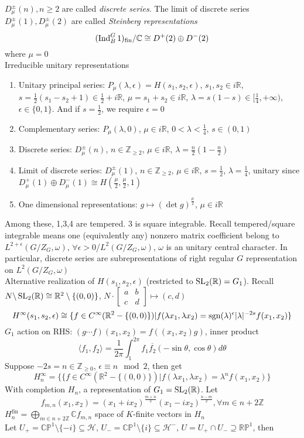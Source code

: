 \documentclass[main]{subfiles}
\begin{document}
$D^\pm_\mu(n),n\geq2$ are called \textit{discrete series}. The limit of discrete series $D^\pm_\mu(1),D^\pm_\mu(2)$ are called \textit{Steinberg representations}
\[(\operatorname{Ind}^G_B1)_{\mathrm{fin}}/\mathbb C\cong D^+(2)\oplus D^-(2)\]
where $\mu=0$ \\
Irreducible unitary representations
\begin{enumerate}
\item Unitary principal series: $P_\mu(\lambda,\epsilon)=H(s_1,s_2,\epsilon)$, $s_1,s_2\in i\mathbb R$, $s=\frac{1}{2}(s_1-s_2+1)\in\frac{1}{2}+i\mathbb R$, $\mu=s_1+s_2\in i\mathbb R$, $\lambda=s(1-s)\in[\frac{1}{4},+\infty)$, $\epsilon\in\{0,1\}$. And if $s=\frac{1}{2}$, we require $\epsilon=0$
\item Complementary series: $P_\mu(\lambda,0)$, $\mu\in i\mathbb R$, $0<\lambda<\frac{1}{4}$, $s\in(0,1)$
\item Discrete series: $D^\pm_\mu(n)$, $n\in\mathbb Z_{\geq2}$, $\mu\in i\mathbb R$, $\lambda=\frac{n}{2}(1-\frac{n}{2})$
\item Limit of discrete series: $D^\pm_\mu(1)$, $n\in\mathbb Z_{\geq2}$, $\mu\in i\mathbb R$, $s=\frac{1}{2}$, $\lambda=\frac{1}{4}$, unitary since $D^+_\mu(1)\oplus D^-_\mu(1)\cong H(\frac{\mu}{2},\frac{\mu}{2},1)$
\item One dimensional representations: $g\mapsto (\det g)^\frac{\mu}{2}$, $\mu\in i\mathbb R$
\end{enumerate}
Among these, 1,3,4 are tempered. 3 is square integrable. Recall tempered/square integrable means one (equivalently any) nonzero matrix coefficient belong to $L^{2+\epsilon}(G/Z_G,\omega)$, $\forall \epsilon>0$/$L^2(G/Z_G,\omega)$, $\omega$ is an unitary central character. In particular, discrete series are subrepresentations of right regular $G$ representation on $L^2(G/Z_G,\omega)$ \\
Alternative realization of $H(s_1,s_2,\epsilon)$ (restricted to $\operatorname{SL}_2(\mathbb R)=G_1$). Recall $N\backslash\operatorname{SL}_2(\mathbb R)\cong \mathbb R^2\setminus\{(0,0)\}$, $N\cdot\begin{bmatrix}
a&b\\
c&d
\end{bmatrix}\mapsto(c,d)$
\[H^\infty(s_1,s_2,\epsilon)\cong\{f\in C^\infty(\mathbb R^2-\{(0,0)\})|f(\lambda x_1,\lambda x_2)=\operatorname{sgn}(\lambda)^\epsilon|\lambda|^{-2s}f(x_1,x_2)\}\]
$G_1$ action on RHS: $(g\cdots f)(x_1,x_2)=f((x_1,x_2)g)$, inner product
\[\langle f_1,f_2\rangle=\frac{1}{2\pi}\int_1^{2\pi}f_1\overline{f_2}(-\sin\theta,\cos\theta)d\theta\]
Suppose $-2s=n\in\mathbb Z_{\geq0}$, $\epsilon\equiv n\mod 2$, then get
\[H^\infty_n=\{\{f\in C^\infty(\mathbb R^2-\{(0,0)\})|f(\lambda x_1,\lambda x_2)=\lambda^nf(x_1,x_2)\}\]
With completion $H_n$, a representation of $G_1=\operatorname{SL}_2(\mathbb R)$. Let
\[f_{m,n}(x_1,x_2)=(x_1+ix_2)^{\frac{m+n}{2}}(x_1-ix_2)^{\frac{n-m}{2}},\forall m\in n+2\mathbb Z\]
$H^{\mathrm{fin}}_n=\bigoplus_{m\in n+2\mathbb Z}\mathbb Cf_{m,n}$ space of $K$-finite vectors in $H_n$ \\
Let $U_+=\mathbb{CP}^1\setminus\{-i\}\subseteq\mathcal H$, $U_-=\mathbb{CP}^1\setminus\{i\}\subseteq\mathcal H^-$, $U=U_+\cap U_-\supseteq\mathbb{RP}^1$, then
\end{document}
